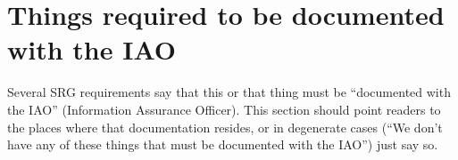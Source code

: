 %

\section{Things required to be documented with the IAO}
\label{DocumentedWithIAO}

Several SRG requirements say that this or that thing must be ``documented
with the IAO'' (Information Assurance Officer). This section should point
readers to the places where that documentation resides, or in degenerate
cases (``We don't have any of these things that must be documented with
the IAO'') just say so.


